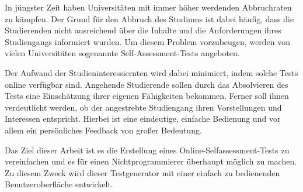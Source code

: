 \label{Einleitung-und-Motivation}
In jüngster Zeit haben Universitäten mit immer höher werdenden Abbruchraten zu kämpfen. 
Der Grund für den Abbruch des Studiums ist dabei häufig, dass die Studierenden nicht ausreichend über die Inhalte und die Anforderungen ihres Studiengangs informiert wurden.
Um diesem Problem vorzubeugen, werden von vielen Universitäten sogenannte Self-Assessment-Tests angeboten.

Der Aufwand der Studieninteressiernten wird dabei minimiert, indem solche Tests online verfügbar sind.
Angehende Studierende sollen durch das Absolvieren des Tests eine Einschätzung ihrer eigenen Fähigkeiten bekommen. 
Ferner soll ihnen verdeutlicht werden, ob der angestrebte Studiengang ihren Vorstellungen und Interessen entspricht.
Hierbei ist eine eindeutige, einfache Bedienung und vor allem ein persönliches Feedback von großer Bedeutung. 

Das Ziel dieser Arbeit ist es die Erstellung eines Online-Selfassessment-Tests zu vereinfachen und es für einen Nichtprogrammierer überhaupt möglich zu machen. 
Zu diesem Zweck wird dieser Testgenerator mit einer einfach zu bedienenden Benutzeroberfläche entwickelt.